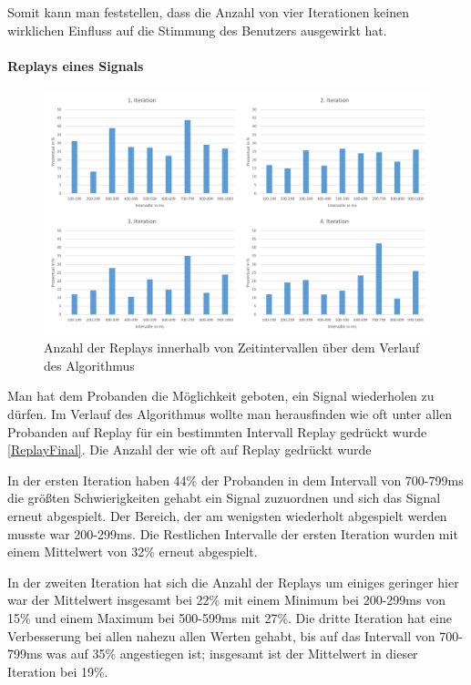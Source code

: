 Somit kann man feststellen, dass die Anzahl von vier Iterationen keinen wirklichen Einfluss auf die Stimmung des Benutzers ausgewirkt hat.


\paragraph{Replays eines Signals}

\begin{figure}[htbp] 
            \centering
   	\includegraphics[width=\textwidth]{pics/analyse/algo/Replay/ReplayFinal2.png}
	\caption{Anzahl der Replays innerhalb von Zeitintervallen {\"u}ber dem Verlauf des Algorithmus}
	\label{fig:ReplayFinal290.png}
\end{figure}

Man hat dem Probanden die M{\"o}glichkeit geboten, ein Signal wiederholen zu d{\"u}rfen. Im Verlauf des Algorithmus wollte man herausfinden wie oft unter allen Probanden auf Replay f{\"u}r ein bestimmten Intervall Replay gedr{\"u}ckt wurde \autoref{ReplayFinal}. Die Anzahl der wie oft auf Replay gedr{\"u}ckt wurde 

In der ersten Iteration haben 44\% der Probanden in dem Intervall von 700-799ms die gr{\"o}{\ss}ten Schwierigkeiten gehabt ein Signal zuzuordnen und sich das Signal erneut abgespielt. Der Bereich, der am wenigsten wiederholt abgespielt werden musste war 200-299ms. Die Restlichen Intervalle der ersten Iteration wurden mit einem Mittelwert von 32\% erneut abgespielt.

In der zweiten Iteration hat sich die Anzahl der Replays um einiges geringer hier war der Mittelwert insgesamt bei 22\% mit einem Minimum bei 200-299ms von 15\% und einem Maximum bei 500-599ms mit 27\%.  Die dritte Iteration hat eine Verbesserung bei allen nahezu allen Werten gehabt, bis auf das Intervall von 700-799ms was auf 35\% angestiegen ist; insgesamt ist der Mittelwert in dieser Iteration bei 19\%. 

